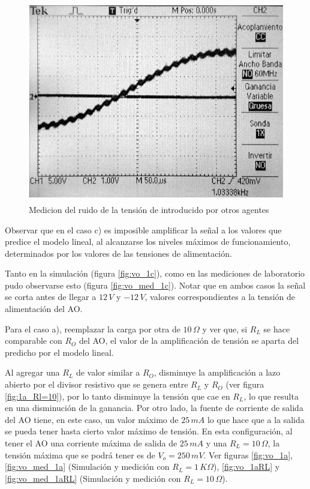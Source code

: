 \documentclass[10pt,spanish,a4paper,openany,notitlepage]{article}
\begin{document}
\begin{enumerate}
\begin{figure}[H]
    \centering
    \includegraphics[width=350pt, height=250pt]{mediciones/A1b-ruido2.jpg}
    \caption{Medicion del ruido de la tensión de introducido por otros agentes}
    \label{fig:1b_ruido2}
    \end{figure}    

{\color{OliveGreen}
Observar que en el caso c) es imposible amplificar la señal a los valores que predice el modelo lineal, al alcanzarse los niveles máximos de funcionamiento, determinados por los valores de las tensiones de alimentación.}

Tanto en la simulación (figura \ref{fig:vo_1c}), como en las mediciones de laboratorio pudo observarse esto (figura \ref{fig:vo_med_1c}). Notar que en ambos casos la señal se corta antes de llegar a $12\,\unit{V}$ y $-12\,\unit{V}$, valores correspondientes a la tensión de alimentación del AO.

{\color{OliveGreen}
Para el caso a), reemplazar la carga por otra de $10\,\unit{\Omega}$ y ver que, si ${R}_{L}$ se hace comparable con ${R}_{O}$ del AO, el valor de la amplificación de tensión se aparta del predicho por el modelo lineal.}

Al agregar una ${R}_{L}$ de valor similar a ${R}_{O}$, disminuye la amplificación a lazo
abierto por el divisor resistivo que se genera entre ${R}_{L}$ y ${R}_{O}$ (ver figura \ref{fig:1a_Rl=10}), por lo tanto
disminuye la tensión que cae en ${R}_{L}$, lo que resulta en una disminución de la ganancia. 
Por otro lado, la fuente de corriente de salida del AO tiene, en este caso, un valor máximo
de $25 \,\unit{mA}$ lo que hace que a la salida se pueda tener hasta cierto valor máximo de
tensión. En esta configuración, al tener el AO una corriente máxima de salida de 
$25 \,\unit{mA}$ y una $R_L = 10\,\unit{\Omega}$, la tensión máxima que se podrá tener es de
$V_o = 250\,\unit{mV}$. Ver figuras \ref{fig:vo_1a}, \ref{fig:vo_med_1a} (Simulación y medición con $R_L = 1\,\unit{K\Omega}$), \ref{fig:vo_1aRL} 
y \ref{fig:vo_med_1aRL} (Simulación y medición con $R_L = 10\,\unit{\Omega}$).


\end{enumerate}
\end{document}

